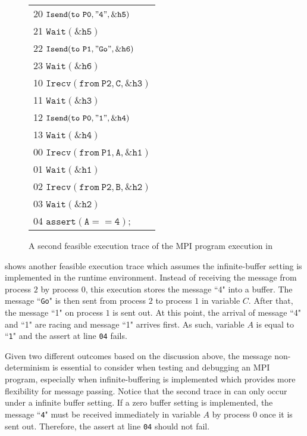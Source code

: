 \begin{figure}[t]
\begin{center}
\setlength{\tabcolsep}{2pt}
\scriptsize \begin{tabular}[t]{l}
20 $\mathtt{Isend(to\ P0, "4", \&h5)}$ \\
21 $\mathtt{Wait(\&h5)}$\\
22 $\mathtt{Isend(to\ P1, "Go", \&h6)}$ \\
23 $\mathtt{Wait(\&h6)}$ \\
\hline
10 $\mathtt{Irecv(from\ P2, C, \&h3)}$ \\
11 $\mathtt{Wait(\&h3)}$ \\
12 $\mathtt{Isend(to\ P0, "1", \&h4)}$ \\
13 $\mathtt{Wait(\&h4)}$ \\
\hline
00 $\mathtt{Irecv(from\ P1, A, \&h1)}$ \\
01 $\mathtt{Wait(\&h1)}$ \\
02 $\mathtt{Irecv(from\ P2, B, \&h2)}$ \\
03 $\mathtt{Wait(\&h2)}$ \\
04 $\mathtt{assert(A == 4);}$ \\
\hline
\end{tabular}
\end{center}
\caption{A second feasible execution trace of the MPI program execution in }
\label{fig:trace2}
\end{figure}

 shows another feasible execution trace which assumes the infinite-buffer setting is implemented in the runtime environment. Instead of receiving the message from process $2$ by process $0$, this execution stores the message ``4" into a buffer. The message ``\texttt{Go}" is then sent from process $2$ to process $1$ in variable $C$. After that, the message ``1" on process $1$ is sent out. At this point, the arrival of message ``4" and ``1" are racing and message ``1" arrives first. As such, variable $A$ is equal to ``\texttt{1}" and the assert at line \texttt{04} fails.

Given two different outcomes based on the discussion above, the message non-determinism is essential to consider when testing and debugging an MPI program, especially when infinite-buffering is implemented which provides more flexibility for message passing. Notice that the second trace in  can only occur under a infinite buffer setting. If a zero buffer setting is implemented, the message ``\texttt{4}" must be received immediately in variable $A$ by process $0$ once it is sent out. Therefore, the assert at line \texttt{04} should not fail. 

